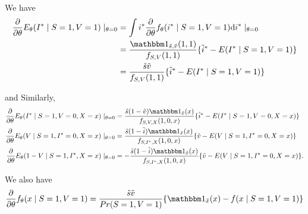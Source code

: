 \documentclass{article}
\begin{document}
We have
\begin{align*}
    \dfrac{\partial}{\partial\theta}E_\theta(I^*\mid S=1, V=1)\mid_{\theta=0} &= \int i^* \dfrac{\partial}{\partial\theta}f_\theta(i^*\mid S=1, V=1)\mathrm d i^*\mid_{\theta = 0}\\
    &= \dfrac{\mathbbm 1_{\tilde s,\tilde v}(1, 1)}{f_{S, V}(1, 1)}\{\tilde i^* - E(I^*\mid S=1, V=1)\}\\
    &= \dfrac{\tilde s\tilde v}{f_{S, V}(1, 1)}\{\tilde i^* - E(I^*\mid S=1, V=1)\}
\end{align*}

and Similarly,
\begin{align*}
    \dfrac{\partial}{\partial\theta}E_\theta(I^*\mid S=1, V=0, X=x)\mid_{\theta=0} &= \dfrac{\tilde s(1-\tilde v)\mathbbm 1_{\tilde x}(x)}{f_{S, V, X}(1, 0, x)}\{\tilde i^* - E(I^*\mid S=1, V=0, X=x)\}\\
     \dfrac{\partial}{\partial\theta}E_\theta(V \mid S=1, I^*=0, X=x)\mid_{\theta=0} &= \dfrac{\tilde s(1-\tilde i)\mathbbm 1_{\tilde x}(x)}{f_{S, I^*, X}(1, 0, x)}\{\tilde v - E(V\mid S=1, I^*=0, X=x)\}\\
     \dfrac{\partial}{\partial\theta}E_\theta(1-V\mid S=1, I^*, X=x)\mid_{\theta=0} &= -\dfrac{\tilde s(1 - \tilde i)\mathbbm 1_{\tilde x}(x)}{f_{S, I^*, X}(1, 0, x)}\{\tilde v - E(V\mid S=1, I^*=0, X=x)\}.
\end{align*}

We also have
$$\dfrac{\partial}{\partial\theta}f_\theta(x\mid S=1, V=1) = \dfrac{\tilde s \tilde v}{Pr(S=1, V=1)}\{\mathbbm 1_{\tilde x}(x)-f(x\mid S=1, V=1)\}$$
\end{document}
